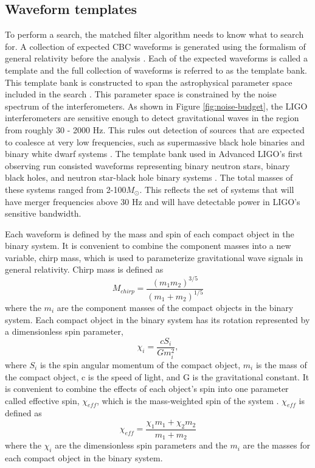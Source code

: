 \subsection{Waveform templates}

To perform a search, the matched filter algorithm needs to know what to search for.
A collection of expected CBC waveforms is generated using
the formalism of general relativity before the analysis \cite{Pan:2009wj,Purrer:2015tud}.
Each of the expected waveforms is called a template and
the full collection of waveforms is referred to as the template bank. This template bank
is constructed to span the astrophysical parameter space included in the search
\cite{GW150914-CBC}. This parameter space is constrained by the noise spectrum of 
the interferometers. As shown in Figure \ref{fig:noise-budget}, the LIGO 
interferometers are sensitive enough to detect gravitational waves in the 
region from roughly 30 - 2000 Hz. This rules out detection of sources that are expected to 
coalesce at very low frequencies, such as supermassive black hole binaries 
\cite{Merloni:2008tj} and 
binary white dwarf systems \cite{PostnovYungelson:2006}. 
The template bank used in Advanced LIGO's first observing 
run consisted waveforms representing binary neutron stars, binary black holes, 
and neutron star-black hole binary systems \cite{GW150914-CBC}. 
The total masses of these systems ranged from 
2-100$M_{\odot}$. This reflects the set of systems that will have merger frequencies 
above 30 Hz and will have detectable power in LIGO's sensitive bandwidth.

Each waveform is defined by the mass and spin of each compact
object in the binary system. 
It is convenient to combine
the component masses into a new variable, chirp mass, which is used to
parameterize gravitational wave signals in general relativity. Chirp mass is defined
as \cite{PhysRev.131.435}
\begin{equation}
M_{chirp} = \frac{(m_1m_2)^{3/5}}{(m_1 + m_2)^{1/5}}
\end{equation}
where the $m_{i}$ are the component masses of the compact objects in the
binary system. 
Each compact object in the binary system has its rotation represented by a 
dimensionless spin parameter,
\begin{equation}
\chi_i = \frac{cS_i}{Gm_i^2},
\end{equation}
where $S_i$ is the spin angular momentum of the compact object, $m_i$ is the mass 
of the compact object, c is the speed of light, and G is the gravitational constant. 
It is convenient to combine the effects of each
object's spin into one parameter called effective spin, $\chi_{eff}$,
which is the
mass-weighted spin of the system \cite{Privitera:2013xza}. $\chi_{eff}$ is defined as
\begin{equation}
\chi_{eff} = \frac{\chi_{1}m_{1} + \chi_{2}m_{2}}{m_{1} + m_{2}}
\end{equation}
where the $\chi_{i}$ are the dimensionless spin parameters \cite{Kidder:1995zr}
and the $m_{i}$ are the masses for each compact object in the binary system. 


